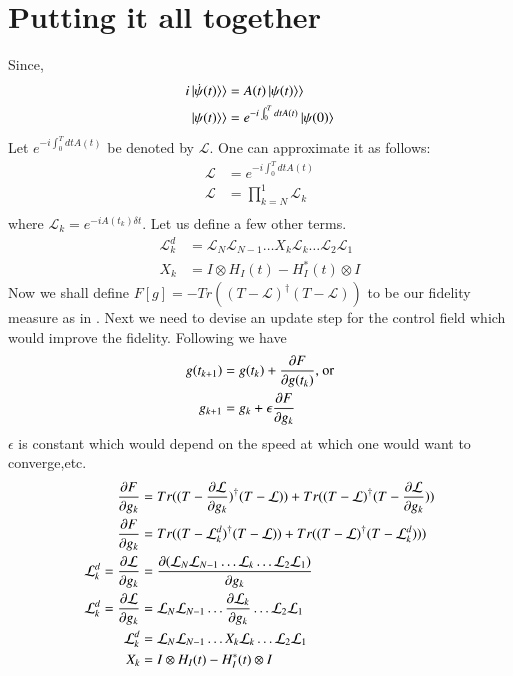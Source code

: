 \section{Putting it all together}
Since,
\begin{align}
    i\ket{\dot{\psi}(t)}\rangle &= A(t)\ket{\psi(t)}\rangle\\
    \ket{\psi(t)}\rangle &= e^{-i\int_{0}^{T}dt A(t)}\ket{\psi(0)}
\end{align}
Let $e^{-i\int_{0}^{T}dt A(t)}$ be denoted by $\mathcal{L}$. One can approximate it as follows:
\begin{align}
    \mathcal{L}&=e^{-i\int_{0}^{T}dt A(t)}\\
    \mathcal{L}&= \prod_{k = N}^{1} \mathcal{L}_{k}\\
\end{align}
where $\mathcal{L}_{k} = e^{-iA(t_{k})\delta t}$.
Let us define a few other terms.
\begin{align}\label{some_def}
    \mathcal{L}^{d}_{k} &= \mathcal{L}_{N}\mathcal{L}_{N-1}\ldots X_{k} \mathcal{L}_{k}\ldots \mathcal{L}_{2}\mathcal{L}_{1}\\
    X_{k} &= I\otimes H_{I}(t) - H_{I}^{*}(t)\otimes I 
\end{align}
Now we shall define $F[g] = - Tr((T - \mathcal{L})^{\dagger}(T - \mathcal{L}))$ to be our fidelity measure as in \cite{khaneja2005optimal}. Next we need to devise an update step for the control field which would improve the fidelity. Following \cite{khaneja2005optimal} we have 
\begin{align}\label{update_step}
    g(t_{k+1})&= g(t_{k}) + \pdv{F}{g(t_{k})} \text{, or}\\
    g_{k+1} &=    g_{k}   + \epsilon\pdv{F}{g_{k}}
\end{align}
$\epsilon$ is  constant which would depend on the speed at which one would want to converge,etc.
\begin{align}
    \pdv{F}{g_{k}}&=Tr((T - \pdv{\mathcal{L}}{g_{k}})^{\dagger}(T - \mathcal{L})) + Tr((T - \mathcal{L})^{\dagger}(T - \pdv{\mathcal{L}}{g_{k}})) \\
    \pdv{F}{g_{k}}&=  Tr((T - \mathcal{L}^{d}_{k})^{\dagger}(T - \mathcal{L})) + Tr((T - \mathcal{L})^{\dagger}(T - \mathcal{L}^{d}_{k})))\\
    \mathcal{L}^{d}_{k}=\pdv{\mathcal{L}}{g_{k}} &= \pdv{(\mathcal{L}_{N}\mathcal{L}_{N-1}\ldots  \mathcal{L}_{k}\ldots \mathcal{L}_{2}\mathcal{L}_{1})}{g_{k}}\\
    \mathcal{L}^{d}_{k}=\pdv{\mathcal{L}}{g_{k}} &= \mathcal{L}_{N}\mathcal{L}_{N-1}\ldots \pdv{ \mathcal{L}_{k}}{g_{k}}\ldots \mathcal{L}_{2}\mathcal{L}_{1}\\
    \mathcal{L}^{d}_{k} &= \mathcal{L}_{N}\mathcal{L}_{N-1}\ldots X_{k} \mathcal{L}_{k}\ldots \mathcal{L}_{2}\mathcal{L}_{1}\\
    X_{k} &= I\otimes H_{I}(t) - H_{I}^{*}(t)\otimes I 
\end{align}
